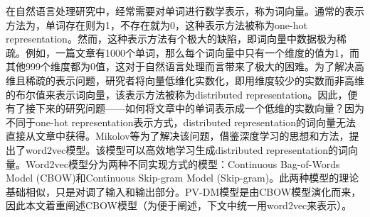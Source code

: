 在自然语言处理研究中，经常需要对单词进行数学表示，称为词向量。通常的表示方法为，单词存在则为1，不存在就为0，这种表示方法被称为one-hot representation。然而，这种表示方法有个极大的缺陷，即词向量中数据极为稀疏。例如，一篇文章有1000个单词，那么每个词向量中只有一个维度的值为1，而其他999个维度都为0值，这对于自然语言处理而言带来了极大的困难。为了解决高维且稀疏的表示问题，研究者将向量低维化实数化，即用维度较少的实数而非高维的布尔值来表示词向量，该表示方法被称为distributed representation。因此，便有了接下来的研究问题——如何将文章中的单词表示成一个低维的实数向量？因为不同于one-hot representation表示方式，distributed representation的词向量无法直接从文章中获得。Mikolov等\cite{mikolov2013efficient}为了解决该问题，借鉴深度学习的思想和方法，提出了word2vec模型。该模型可以高效地学习生成distributed representation的词向量。Word2vec模型分为两种不同实现方式的模型：Continuous Bag-of-Words Model (CBOW)和Continuous Skip-gram Model (Skip-gram)。此两种模型的理论基础相似，只是对调了输入和输出部分。PV-DM模型是由CBOW模型演化而来，因此本文着重阐述CBOW模型（为便于阐述，下文中统一用word2vec来表示）。

